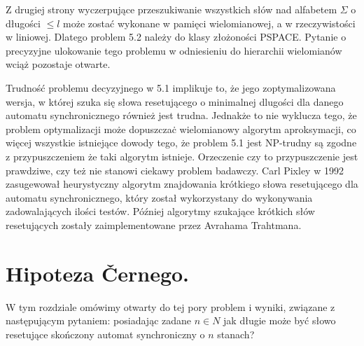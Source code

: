 \documentclass[12pt,a4paper]{article}
\begin{document}
Z drugiej strony wyczerpuj\k{a}ce przeszukiwanie wszystkich s{\l}\'ow nad alfabetem $\Sigma$ o d{\l}ugo\'sci $\leq l$ mo\.ze zosta\'c wykonane w pami\k{e}ci wielomianowej, a w rzeczywisto\'sci w liniowej. Dlatego problem 5.2 nale\.zy do klasy z{\l}o\.zono\'sci PSPACE. Pytanie o precyzyjne ulokowanie tego problemu w odniesieniu do hierarchii wielomian\'ow wci\k{a}\.z pozostaje otwarte. 

Trudno\'s\'c problemu decyzyjnego w 5.1 implikuje to, \.ze jego zoptymalizowana wersja, w kt\'orej szuka si\k{e} s{\l}owa resetuj\k{a}cego o minimalnej d{l}ugo\'sci dla danego automatu synchronicznego r\'ownie\.z jest trudna. Jednak\.ze to nie wyklucza tego, \.ze problem optymalizacji mo\.ze dopuszcza\.c wielomianowy algorytm aproksymacji, co wi\k{e}cej wszystkie istniej\k{a}ce dowody tego, \.ze problem 5.1 jest NP-trudny s\k{a} zgodne z  przypuszczeniem \.ze taki algorytm istnieje. Orzeczenie czy to przypuszczenie jest prawdziwe, czy te\.z nie stanowi ciekawy problem badawczy. Carl Pixley w 1992 zasugewowa{\l} heurystyczny algorytm znajdowania kr\'otkiego s{\l}owa resetuj\k{a}cego dla automatu synchronicznego, kt\'ory zosta{\l} wykorzystany do wykonywania zadowalaj\k{a}cych ilo\'sci test\'ow. P\'o\'zniej algorytmy szukaj\k{a}ce kr\'otkich s{\l}\'ow resetuj\k{a}cych zosta{\l}y zaimplementowane przez Avrahama Trahtmana.


\newpage
\section{Hipoteza \v Cernego.}

W tym rozdziale om\'{o}wimy otwarty do tej pory problem i wyniki, zwi\k{a}zane z nast\k{e}puj\k{a}cym pytaniem: posiadaj\k{a}c zadane $n \in N$ jak d{\l}ugie mo\.ze by\'c s{\l}owo resetuj\k{a}ce sko\'nczony automat synchroniczny o $n$ stanach? 
\end{document}
